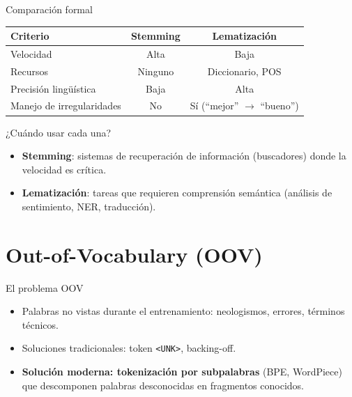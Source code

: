 \documentclass[aspectratio=169, 10pt, xcolor=table]{beamer}
\begin{document}
\begin{frame}{Comparación formal}
    \begin{table}
        \centering
        \begin{tabular}{l|c|c}
            \toprule
            \textbf{Criterio} & \textbf{Stemming} & \textbf{Lematización} \\
            \midrule
            Velocidad & Alta & Baja \\
            Recursos & Ninguno & Diccionario, POS \\
            Precisión lingüística & Baja & Alta \\
            Manejo de irregularidades & No & Sí (``mejor'' $\rightarrow$ ``bueno'') \\
            \bottomrule
        \end{tabular}
    \end{table}
\end{frame}

\begin{frame}{¿Cuándo usar cada una?}
    \begin{itemize}
        \item \textbf{Stemming}: sistemas de recuperación de información (buscadores) donde la velocidad es crítica.
        \item \textbf{Lematización}: tareas que requieren comprensión semántica (análisis de sentimiento, NER, traducción).
    \end{itemize}
\end{frame}

\section{Out-of-Vocabulary (OOV)}

\begin{frame}{El problema OOV}
    \begin{itemize}
        \item Palabras no vistas durante el entrenamiento: neologismos, errores, términos técnicos.
        \item Soluciones tradicionales: token \texttt{<UNK>}, backing-off.
        \item \textbf{Solución moderna: tokenización por subpalabras} (BPE, WordPiece) que descomponen palabras desconocidas en fragmentos conocidos.
    \end{itemize}
\end{frame}
\end{document}
